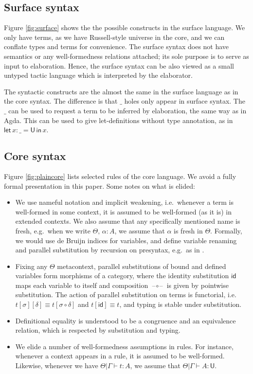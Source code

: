 \documentclass[acmsmall,review,anonymous,prologue,dvipsnames]{acmart}\settopmatter{printfolios=true,printccs=false,printacmref=false}
\newcommand{\slet}{\boldsymbol{\mathsf{let}}}
\renewcommand{\sin}{\boldsymbol{\mathsf{in}}}
\renewcommand{\U}{\mathsf{U}}
\newcommand{\id}{\mathsf{id}}
\newcommand{\blank}{\mathord{\hspace{1pt}\text{--}\hspace{1pt}}}
\theoremstyle{remark}
\begin{document}
\subsection{Surface syntax}
Figure \ref{fig:surface} shows the the possible constructs in the surface
language. We only have terms, as we have Russell-style universe in the core, and
we can conflate types and terms for convenience. The surface syntax does not
have semantics or any well-formedness relations attached; its sole purpose is to
serve as input to elaboration. Hence, the surface syntax can be also viewed as a
small untyped tactic language which is interpreted by the elaborator.

The syntactic constructs are the almost the same in the surface language as in
the core syntax. The difference is that $\_$ holes only appear in surface
syntax. The $\_$ can be used to request a term to be inferred by elaboration,
the same way as in Agda.  This can be used to give let-definitions without type
annotation, as in $\slet\,x : \_ = \U\,\sin\,x$.

\subsection{Core syntax}

Figure \ref{fig:plaincore} lists selected rules of the core language. We avoid a
fully formal presentation in this paper. Some notes on what is elided:
\begin{itemize}
  \item We use nameful notation and implicit weakening, i.e.\ whenever a term is
    well-formed in some context, it is assumed to be well-formed (as it is) in
    extended contexts. We also assume that any specifically mentioned name is
    fresh, e.g.\ when we write $\Theta,\,\alpha : A$, we assume that $\alpha$ is
    fresh in $\Theta$.  Formally, we would use de Bruijn indices for variables,
    and define variable renaming and parallel substitution by recursion on
    presyntax, e.g.\ as in \cite{schafer2015autosubst}.
  \item Fixing any $\Theta$ metacontext, parallel substitutions of bound and
    defined variables form morphisms of a category, where the identity
    substitution $\id$ maps each variable to itself and composition
    $\blank\circ\blank$ is given by pointwise substitution. The action of
    parallel substitution on terms is functorial, i.e.\ $t[\sigma][\delta]
    \equiv t[\sigma\circ\delta]$ and $t[\id] \equiv t$, and typing is stable
    under substitution.
  \item
    Definitional equality is understood to be a congruence and an equivalence relation,
    which is respected by substitution and typing.
  \item
    We elide a number of well-formedness assumptions in rules. For instance, whenever
    a context appears in a rule, it is assumed to be well-formed. Likewise, whenever
    we have $\Theta|\Gamma\vdash t : A$, we assume that $\Theta|\Gamma\vdash A : \U$.
\end{itemize}
\end{document}
